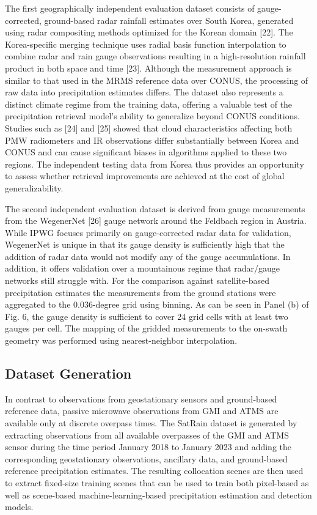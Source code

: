 \documentclass[11pt]{article}
\begin{document}
The first geographically independent evaluation dataset consists of gauge-corrected, ground-based radar rainfall estimates over South Korea, generated using radar compositing methods optimized for the Korean domain [22]. The Korea-specific merging technique uses radial basis function interpolation to combine radar and rain gauge observations resulting in a high-resolution rainfall product in both space and time [23]. Although the measurement approach is similar to that used in the MRMS reference data over CONUS, the processing of raw data into precipitation estimates differs. The dataset also represents a distinct climate regime from the training data, offering a valuable test of the precipitation retrieval model’s ability to generalize beyond CONUS conditions. Studies such as [24] and [25]
showed that cloud characteristics affecting both PMW radiometers and IR observations differ substantially between Korea and CONUS and can cause significant biases in algorithms applied to these two regions. The independent testing data from Korea thus provides an opportunity to assess whether retrieval improvements are achieved at the cost of global generalizability.

The second independent evaluation dataset is derived from gauge measurements from the WegenerNet [26] gauge network around the Feldbach region in Austria. While IPWG focuses primarily on gauge-corrected radar data for validation, WegenerNet is unique in that its gauge density is sufficiently high that the addition of radar data would not modify any of the gauge accumulations. In addition, it offers validation over a mountainous regime that radar/gauge networks still struggle with. For the comparison against satellite-based precipitation estimates the measurements from the ground stations were aggregated to the 0.036-degree grid using binning. As can be seen in Panel (b) of Fig. 6, the gauge density is sufficient to cover 24 grid cells with at least two gauges per cell. The mapping of the gridded measurements to the on-swath geometry was performed using nearest-neighbor interpolation.


\subsection{Dataset Generation}

In contrast to observations from geostationary sensors and ground-based reference data, passive microwave observations from GMI and ATMS are available only at discrete overpass times. The SatRain dataset is generated by extracting observations from all available overpasses of the GMI and ATMS sensor during the time period January 2018 to January 2023 and adding the corresponding geostationary observations, ancillary data, and ground-based reference precipitation estimates. The resulting collocation scenes are then used to extract fixed-size training scenes that can be used to train both pixel-based as well as scene-based machine-learning-based precipitation estimation and detection models.
\end{document}
